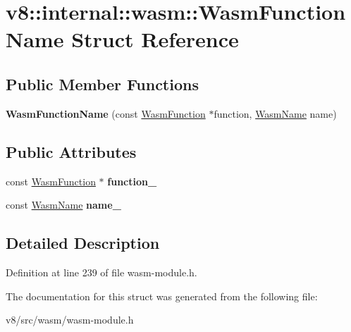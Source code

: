 \hypertarget{structv8_1_1internal_1_1wasm_1_1WasmFunctionName}{}\section{v8\+:\+:internal\+:\+:wasm\+:\+:Wasm\+Function\+Name Struct Reference}
\label{structv8_1_1internal_1_1wasm_1_1WasmFunctionName}
\subsection*{Public Member Functions}
\begin{DoxyCompactItemize}
\item 
\mbox{\label{structv8_1_1internal_1_1wasm_1_1WasmFunctionName_aa4284aad040f53a7e0aee14e770ac027}} 
{\bfseries Wasm\+Function\+Name} (const \mbox{\hyperlink{structv8_1_1internal_1_1wasm_1_1WasmFunction}{Wasm\+Function}} $\ast$function, \mbox{\hyperlink{classv8_1_1internal_1_1Vector}{Wasm\+Name}} name)
\end{DoxyCompactItemize}
\subsection*{Public Attributes}
\begin{DoxyCompactItemize}
\item 
\mbox{\label{structv8_1_1internal_1_1wasm_1_1WasmFunctionName_ae2424a423048d726270faf5f42b5f142}} 
const \mbox{\hyperlink{structv8_1_1internal_1_1wasm_1_1WasmFunction}{Wasm\+Function}} $\ast$ {\bfseries function\+\_\+}
\item 
\mbox{\label{structv8_1_1internal_1_1wasm_1_1WasmFunctionName_a2b1103bd064bf7f990277a8ac58eee20}} 
const \mbox{\hyperlink{classv8_1_1internal_1_1Vector}{Wasm\+Name}} {\bfseries name\+\_\+}
\end{DoxyCompactItemize}


\subsection{Detailed Description}


Definition at line 239 of file wasm-\/module.\+h.



The documentation for this struct was generated from the following file\+:\begin{DoxyCompactItemize}
\item 
v8/src/wasm/wasm-\/module.\+h\end{DoxyCompactItemize}
